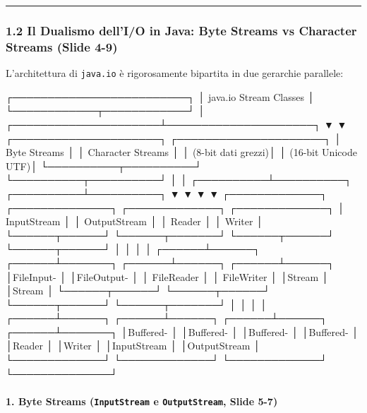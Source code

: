 \documentclass[11pt,a4paper]{article}
\newcommand{\passthrough}[1]{#1}
\begin{document}
\begin{center}\rule{0.5\linewidth}{0.5pt}\end{center}

\subsubsection{1.2 Il Dualismo dell'I/O in Java: Byte Streams vs
Character Streams (Slide
4-9)}\label{il-dualismo-dellio-in-java-byte-streams-vs-character-streams-slide-4-9}

L'architettura di \passthrough{\lstinline!java.io!} è rigorosamente
bipartita in due gerarchie parallele:

\needspace{7cm}
\begin{asciibox}
                      ┌─────────────────────────┐
                      │ java.io Stream Classes  │
                      └────────────┬────────────┘
                                   │
             ┌─────────────────────┴─────────────────────┐
             ▼                                           ▼
  ┌─────────────────────┐                     ┌─────────────────────┐
  │    Byte Streams     │                     │  Character Streams  │
  │  (8-bit dati grezzi)│                     │ (16-bit Unicode UTF)│
  └──────────┬──────────┘                     └──────────┬──────────┘
             │                                           │
  ┌──────────┴──────────┐                     ┌──────────┴──────────┐
  ▼                     ▼                     ▼                     ▼
┌─────────────┐ ┌──────────────┐       ┌─────────────┐ ┌─────────────┐
│ InputStream │ │ OutputStream │       │   Reader    │ │   Writer    │
└──────┬──────┘ └──────┬───────┘       └──────┬──────┘ └──────┬──────┘
       │               │                      │               │
┌──────┴──────┐ ┌──────┴───────┐       ┌──────┴──────┐ ┌──────┴──────┐
│FileInput-   │ │FileOutput-   │       │ FileReader  │ │ FileWriter  │
│Stream       │ │Stream        │       └──────┬──────┘ └──────┬──────┘
└──────┬──────┘ └──────┬───────┘              │               │
       │               │               ┌──────┴──────┐ ┌──────┴──────┐
┌──────┴──────┐ ┌──────┴───────┐       │Buffered-    │ │Buffered-    │
│Buffered-    │ │Buffered-     │       │Reader       │ │Writer       │
│InputStream  │ │OutputStream  │       └─────────────┘ └─────────────┘
└─────────────┘ └──────────────┘
\end{asciibox}

\paragraph{\texorpdfstring{1. Byte Streams (\texttt{InputStream} e
\texttt{OutputStream}, Slide
5-7)}{1. Byte Streams (InputStream e OutputStream, Slide 5-7)}}\label{byte-streams-inputstream-e-outputstream-slide-5-7}
\end{document}
